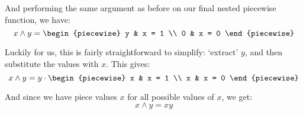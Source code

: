 \begin{example}
    And performing the same argument as before on our final nested piecewise function, we have:
    $$
        x\land y = \begin{piecewise}
            y & x = 1 \\
            0 & x = 0
        \end{piecewise}
    $$

    Luckily for us, this is fairly straightforward to simplify: `extract' $y$, and then substitute the values with $x$. This gives:
    $$
        x\land y = y\cdot\begin{piecewise}
            x & x = 1 \\
            x & x = 0
        \end{piecewise}
    $$

    And since we have piece values $x$ for all possible values of $x$, we get:
    $$
        x\land y = xy
    $$
\end{example}

